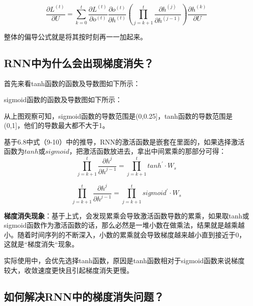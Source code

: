 \[
\frac{\partial L^{(t)}}{\partial U}=\sum_{k=0}^{t}\frac{\partial L^{(t)}}{\partial o^{(t)}}\frac{\partial o^{(t)}}{\partial h^{(t)}}(\prod_{j=k+1}^{t}\frac{\partial h^{(j)}}{\partial h^{(j-1)}})\frac{\partial h^{(k)}}{\partial U}
\]

整体的偏导公式就是将其按时刻再一一加起来。

\subsection{RNN中为什么会出现梯度消失？}\label{rnnux4e2dux4e3aux4ec0ux4e48ux4f1aux51faux73b0ux68afux5ea6ux6d88ux5931}

首先来看tanh函数的函数及导数图如下所示：


sigmoid函数的函数及导数图如下所示：


从上图观察可知，sigmoid函数的导数范围是(0,0.25{]}，tanh函数的导数范围是(0,1{]}，他们的导数最大都不大于1。

​
基于6.8中式（9-10）中的推导，RNN的激活函数是嵌套在里面的，如果选择激活函数为\(tanh\)或\(sigmoid\)，把激活函数放进去，拿出中间累乘的那部分可得：
\[
\prod_{j=k+1}^{t}{\frac{\partial{h^{j}}}{\partial{h^{j-1}}}} = \prod_{j=k+1}^{t}{tanh^{'}}\cdot W_{s}
\]

\[
\prod_{j=k+1}^{t}{\frac{\partial{h^{j}}}{\partial{h^{j-1}}}} = \prod_{j=k+1}^{t}{sigmoid^{'}}\cdot W_{s}
\]

​
\textbf{梯度消失现象}：基于上式，会发现累乘会导致激活函数导数的累乘，如果取tanh或sigmoid函数作为激活函数的话，那么必然是一堆小数在做乘法，结果就是越乘越小。随着时间序列的不断深入，小数的累乘就会导致梯度越来越小直到接近于0，这就是``梯度消失``现象。

​
实际使用中，会优先选择tanh函数，原因是tanh函数相对于sigmoid函数来说梯度较大，收敛速度更快且引起梯度消失更慢。

\subsection{如何解决RNN中的梯度消失问题？}\label{ux5982ux4f55ux89e3ux51b3rnnux4e2dux7684ux68afux5ea6ux6d88ux5931ux95eeux9898}

